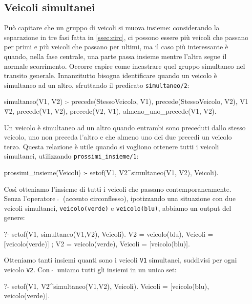 \subsection{Veicoli simultanei}
Può capitare che un gruppo di veicoli si muova insieme: considerando la separazione in tre fasi fatta in \ref{ssec:circ}, ci possono essere più veicoli che passano per primi e più veicoli che passano per ultimi, ma il caso più interessante è quando, nella fase centrale, una parte passa insieme mentre l'altra segue il normale scorrimento. Occorre capire come incastrare quel gruppo simultaneo nel transito generale. Innanzitutto bisogna identificare quando un veicolo è simultaneo ad un altro, sfruttando il predicato \texttt{simultaneo/2}:
\begin{verbatimtab}
simultaneo(V1, V2) :-
	precede(StessoVeicolo, V1),
	precede(StessoVeicolo, V2),
	V1 \= V2,
	\+ precede(V1, V2),
	\+ precede(V2, V1),
	almeno_uno_precede(V1, V2).
\end{verbatimtab}

Un veicolo è simultaneo ad un altro quando entrambi sono preceduti dallo stesso veicolo, uno non preceda l'altro e che almeno uno dei due precedi un veicolo terzo. Questa relazione è utile quando si vogliono ottenere tutti i veicoli simultanei, utilizzando \texttt{prossimi\_insieme/1}:
\begin{verbatimtab}
prossimi_insieme(Veicoli) :-
	setof(V1, V2^simultaneo(V1, V2), Veicoli).
\end{verbatimtab}

Così otteniamo l'insieme di tutti i veicoli che passano contemporaneamente. Senza l'operatore $\ \widehat{}\ $ (accento circonflesso), ipotizzando una situazione con due veicoli simultanei, \texttt{veicolo(verde)} e \texttt{veicolo(blu)}, abbiamo un output del genere:

\begin{verbatimtab}
?- setof(V1, simultaneo(V1,V2), Veicoli).
V2 = veicolo(blu),
Veicoli = [veicolo(verde)] ;
V2 = veicolo(verde),
Veicoli = [veicolo(blu)].
\end{verbatimtab}

Otteniamo tanti insiemi quanti sono i veicoli \texttt{V1} simultanei, suddivisi per ogni veicolo \texttt{V2}. Con $\ \widehat{}\ $ uniamo tutti gli insiemi in un unico set:

\begin{verbatimtab}
?- setof(V1, V2^simultaneo(V1,V2), Veicoli).
Veicoli = [veicolo(blu), veicolo(verde)].
\end{verbatimtab}

